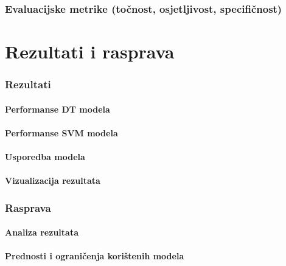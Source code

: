 \documentclass[zavrsnirad]{fer}
\begin{document}
\subsection{Evaluacijske metrike (točnost, osjetljivost, specifičnost)}





\chapter{Rezultati i rasprava}
\label{pog:rezultati_i_rasprava}

\subsection{Rezultati}
\subsubsection{Performanse DT modela}

\subsubsection{Performanse SVM modela}

\subsubsection{Usporedba modela}

\subsubsection{Vizualizacija rezultata}

\subsection{Rasprava}
\subsubsection{Analiza rezultata}

\subsubsection{Prednosti i ograničenja korištenih modela}
\end{document}
